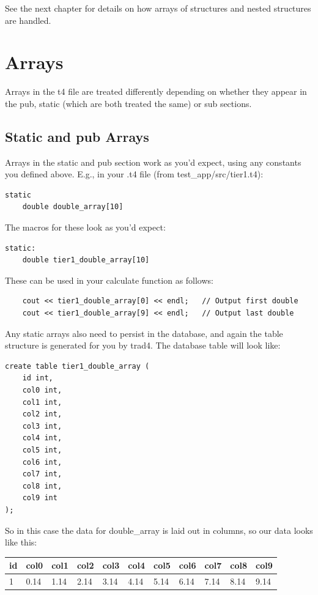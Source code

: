 \documentclass{report}
\begin{document}
See the next chapter for details on how arrays of structures and nested structures are handled.




\section{Arrays}

Arrays in the t4 file are treated differently depending on whether they appear in the pub, static (which are both treated the same) or sub sections. 

\subsection{Static and pub Arrays}

Arrays in the static and pub section work as you'd expect, using any constants you defined above. E.g., in your .t4 file (from test_app/src/tier1.t4):

\begin{verbatim}
static
    double double_array[10]
\end{verbatim}

The macros for these look as you'd expect:

\begin{verbatim}
static:
    double tier1_double_array[10]
\end{verbatim}

These can be used in your calculate function as follows:

\begin{verbatim}
    cout << tier1_double_array[0] << endl;   // Output first double
    cout << tier1_double_array[9] << endl;   // Output last double
\end{verbatim}

Any static arrays also need to persist in the database, and again the table structure is generated for you 
by trad4. The database table will look like:

\begin{verbatim}
create table tier1_double_array (
    id int,
    col0 int,
    col1 int,
    col2 int,
    col3 int,
    col4 int,
    col5 int,
    col6 int,
    col7 int,
    col8 int,
    col9 int
);
\end{verbatim}

So in this case the data for double_array is laid out in columns, so our data looks like this:


\begin {tabular} {| l | l | l | l | l | l | l | l | l | l | l |}
\hline
id & col0 & col1 & col2 & col3 & col4 & col5 & col6 & col7 & col8 & col9 \\
\hline
1 & 0.14 & 1.14 & 2.14 & 3.14 & 4.14 & 5.14 & 6.14 & 7.14 & 8.14 & 9.14 \\
\hline
\end {tabular}
\end{document}
